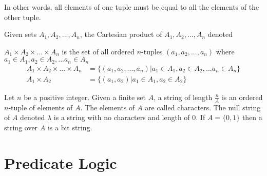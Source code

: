 \documentclass[11pt]{article}
\begin{document}
In other words, all elements of one tuple must be equal to all the elements of the other tuple.

\begin{definition}\label{def:cartesian-product}
    Given sets $A_1, A_2, ..., A_n$, the Cartesian product of $A_1, A_2, ..., A_n$
    denoted

    $A_1 \times A_2 \times ... \times A_n$ is the set of all ordered $n$-tuples
    $(a_1, a_2, ..., a_n)$ where $a_1 \in A_1, a_2 \in A_2, ... a_n \in A_n$
    \begin{equation}
        \begin{aligned}
            A_1 \times A_2 \times ... \times A_n &= \{ (a_1, a_2, ..., a_n) | a_1 \in A_1, a_2 \in A_2, ... a_n \in A_n \} \\
            A_1 \times A_2 &= \{ (a_1, a_2) | a_1 \in A_1, a_2 \in A_2 \}
        \end{aligned}
    \end{equation}
\end{definition}

\begin{definition}[Strings]\label{def:string}
    Let $n$ be a positive integer. Given a finite set $A$, a string
    of length $\frac{n}{A}$ is an ordered $n$-tuple of elements of $A$.
    The elements of $A$ are called characters. The null string of $A$
    denoted $\lambda$ is a string with no characters and length of $0$.
    If $A = \{0, 1\}$ then a string over $A$ is a bit string.
\end{definition}

\newpage
\section{Predicate Logic}
\end{document}
